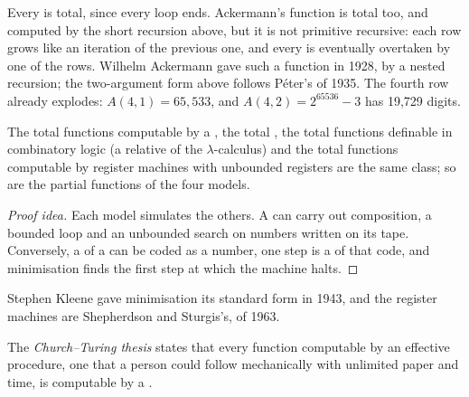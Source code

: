 Every  is total, since every loop ends. Ackermann's function is total too, and computed by the short recursion above, but it is not primitive recursive: each row grows like an iteration of the previous one, and every  is eventually overtaken by one of the rows. Wilhelm Ackermann gave such a function in 1928, by a nested recursion; the two-argument form above follows Péter's of 1935. %
The fourth row already explodes: $A(4, 1) = 65{,}533$, and $A(4, 2) = 2^{65536} - 3$ has 19,729 digits.

\begin{theorem}\label{thm:b3:computability:equivalence}
The total functions computable by a , the total , the total functions definable in combinatory logic (a relative of the \(\lambda\)-calculus) and the total functions computable by register machines with unbounded registers are the same class; so are the partial functions of the four models.
\end{theorem}

\begin{proof}[Proof idea]
Each model simulates the others. A  can carry out composition, a bounded loop and an unbounded search on numbers written on its tape. Conversely, a  of a  can be coded as a number, one step is a  of that code, and minimisation finds the first step at which the machine halts.
\end{proof}

Stephen Kleene gave minimisation its standard form in 1943, and the register machines are Shepherdson and Sturgis's, of 1963. %

\begin{definition}\label{def:b3:computability:thesis}
The \emph{Church--Turing thesis} states that every function computable by an effective procedure, one that a person could follow mechanically with unlimited paper and time, is computable by a .
\end{definition}

